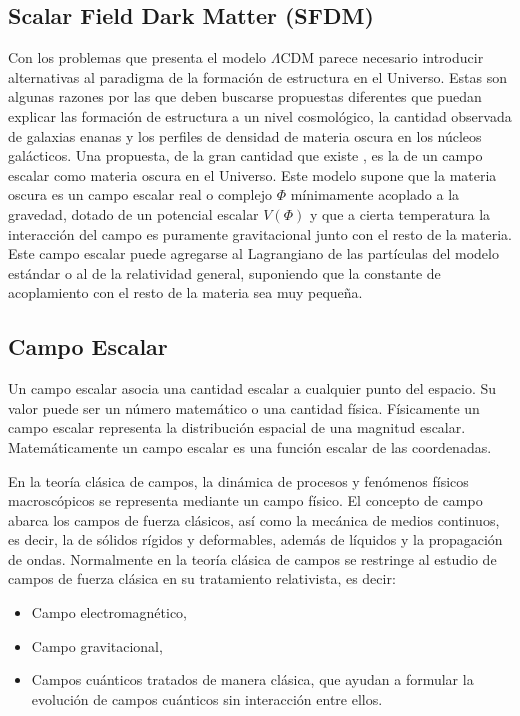 \documentclass[a4paper,openright,10pt, oneside, final]{book}
\begin{document}
\subsection{Scalar Field Dark Matter (SFDM)}
Con los problemas que presenta el modelo $\Lambda$CDM parece necesario introducir alternativas al paradigma de la formación de estructura en el Universo. Estas son algunas razones por las que deben buscarse propuestas diferentes que puedan explicar las formación de estructura a un nivel cosmológico, la cantidad observada de galaxias enanas y los perfiles de densidad de materia oscura en los núcleos galácticos.
Una propuesta, de la gran cantidad 	que existe \cite{1.3.001}, es la de un campo escalar como materia oscura en el Universo. Este modelo supone que la materia oscura es un campo escalar real o complejo $\Phi$ mínimamente acoplado a la gravedad, dotado de un potencial escalar $V(\Phi)$ y que a cierta temperatura la interacción  del campo es puramente gravitacional junto con el resto de la materia. Este campo escalar puede agregarse al Lagrangiano de las partículas del modelo estándar o al de la relatividad general, suponiendo que la constante de acoplamiento con el resto de la materia sea muy pequeña.

\subsection*{Campo Escalar}
Un campo escalar asocia una cantidad escalar a cualquier punto del espacio. Su valor puede ser un número matemático o una cantidad física. Físicamente un campo escalar representa la distribución espacial de una magnitud escalar. Matemáticamente un campo escalar es una función escalar de las coordenadas.

En la teoría clásica de campos, la dinámica de procesos y fenómenos físicos macroscópicos se representa mediante un campo físico. El concepto de campo abarca los campos de fuerza clásicos, así como la mecánica de medios continuos, es decir, la de sólidos rígidos y deformables, además de líquidos y la propagación de ondas. Normalmente en la teoría clásica de campos se restringe al estudio de campos de fuerza clásica en su tratamiento relativista, es decir: 
\begin{itemize}
\item Campo electromagnético,
\item Campo gravitacional,
\item Campos cuánticos tratados de manera clásica, que ayudan a formular la evolución de campos cuánticos sin interacción entre ellos.
\end{itemize}
\end{document}
